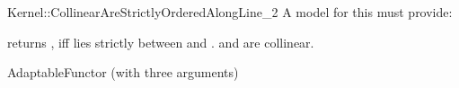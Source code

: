 \begin{ccRefFunctionObjectConcept}{Kernel::CollinearAreStrictlyOrderedAlongLine_2}
A model for this must provide:


         {returns , iff  lies strictly between 
          and . \ccPrecond {} and 
          are collinear.}

\ccRefines
AdaptableFunctor (with three arguments)

\ccSeeAlso
{}  \\

\end{ccRefFunctionObjectConcept}
